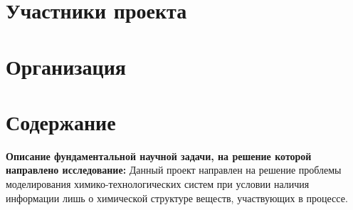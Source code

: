 \section{Участники проекта}

\section{Организация}

\section{Содержание}
\textbf{Описание фундаментальной научной задачи, на решение которой направлено исследование:}
Данный проект направлен на решение проблемы моделирования химико-технологических систем при условии наличия информации лишь о химической структуре веществ, участвующих в процессе.

